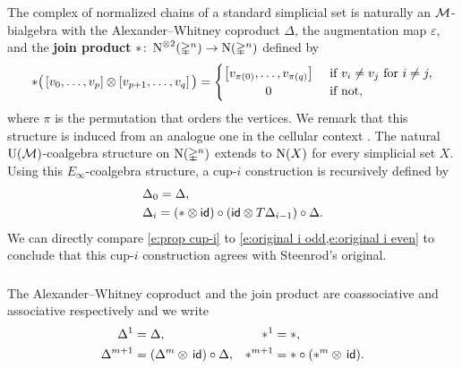 The complex of normalized chains of a standard simplicial set is naturally an $\operatorname{\mathcal{M}}$-bialgebra with the Alexander--Whitney coproduct $\Delta$, the augmentation map $\varepsilon$, and the \textbf{join product} $\ast \colon \operatorname{N}^{\otimes 2}(\mathbb{\Delta}^n) \to \operatorname{N}(\mathbb{\Delta}^n)$ defined by
\[
\ast \big(\left[v_0, \dots, v_p \right] \ot \left[v_{p+1}, \dots, v_q\right]\big) =
\begin{cases} \left[v_{\pi(0)}, \dots, v_{\pi(q)}\right] & \text{ if } v_i \neq v_j \text{ for } i \neq j, \\
\hfil 0 & \text{ if not}, \end{cases}
\]
where $\pi$ is the permutation that orders the vertices.
We remark that this structure is induced from an analogue one in the cellular context \cite{medina2021prop2}.
The natural $\operatorname{U}(\operatorname{\mathcal{M}})$-coalgebra structure on $\operatorname{N}(\mathbb{\Delta}^n)$ extends to $\operatorname{N}(X)$ for every simplicial set $X$.
Using this $E_\infty$-coalgebra structure, a \mbox{cup-$i$} construction is recursively defined by
\begin{equation} \label{e:prop cup-i}
\begin{split}
& \Delta_0 = \Delta, \\
& \Delta_i =
(\ast \otimes \mathsf{id}) \circ (\mathsf{id} \otimes T \Delta_{i-1}) \circ \Delta.
\end{split}
\end{equation}
We can directly compare \cref{e:prop cup-i} to \cref{e:original i odd,e:original i even} to conclude that this \mbox{cup-$i$} construction agrees with Steenrod's original.

\subsubsection{}

The Alexander--Whitney coproduct and the join product are coassociative and associative respectively and we write
\begin{align*}
\Delta^1 &= \Delta, &
\ast^1 &= \ast, \\
\Delta^{m+1} &= (\Delta^m \otimes \, \mathsf{id}) \circ \Delta, &
\ast^{m+1} &= \ast \circ (\ast^m \otimes \, \mathsf{id}).
\end{align*}

